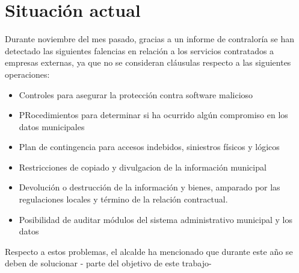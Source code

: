 \section{Situación actual}


Durante noviembre del mes pasado, gracias a un informe de contraloría se han detectado las siguientes falencias en relación a los servicios contratados a empresas externas, ya que no se consideran cláusulas respecto a las siguientes operaciones:

\begin{itemize}
    \item Controles para asegurar la protección contra software malicioso
    \item PRocedimientos para determinar si ha ocurrido algún compromiso en los datos municipales
    \item Plan de contingencia para accesos indebidos, siniestros físicos y lógicos
    \item Restricciones de copiado y divulgacion de la información municipal
    \item Devolución o destrucción de la información y bienes, amparado por las regulaciones locales y término de la relación contractual.
    \item Posibilidad de auditar módulos del sistema administrativo municipal y los datos
\end{itemize}

Respecto a estos problemas, el alcalde ha mencionado que durante este año se deben de solucionar - parte del objetivo de este trabajo-